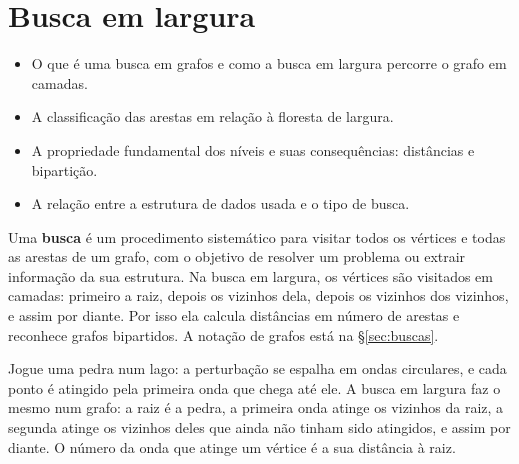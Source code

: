 \chapter{Busca em largura}\label{cap:bfs}\label{sec:bfs}
\begin{objetivos}
\begin{itemize}
  \item O que é uma busca em grafos e como a busca em largura percorre o grafo em camadas.
  \item A classificação das arestas em relação à floresta de largura.
  \item A propriedade fundamental dos níveis e suas consequências: distâncias e bipartição.
  \item A relação entre a estrutura de dados usada e o tipo de busca.
\end{itemize}
\end{objetivos}

Uma \textbf{busca} é um procedimento sistemático para visitar todos os vértices e todas as arestas de um grafo, com o objetivo de resolver um problema ou extrair informação da sua estrutura. Na busca em largura, os vértices são visitados em camadas: primeiro a raiz, depois os vizinhos dela, depois os vizinhos dos vizinhos, e assim por diante. Por isso ela calcula distâncias em número de arestas e reconhece grafos bipartidos. A notação de grafos está na §\ref{sec:buscas}.

\begin{intuicao}
Jogue uma pedra num lago: a perturbação se espalha em ondas circulares, e cada ponto é atingido pela primeira onda que chega até ele. A busca em largura faz o mesmo num grafo: a raiz é a pedra, a primeira onda atinge os vizinhos da raiz, a segunda atinge os vizinhos deles que ainda não tinham sido atingidos, e assim por diante. O número da onda que atinge um vértice é a sua distância à raiz.
\end{intuicao}

